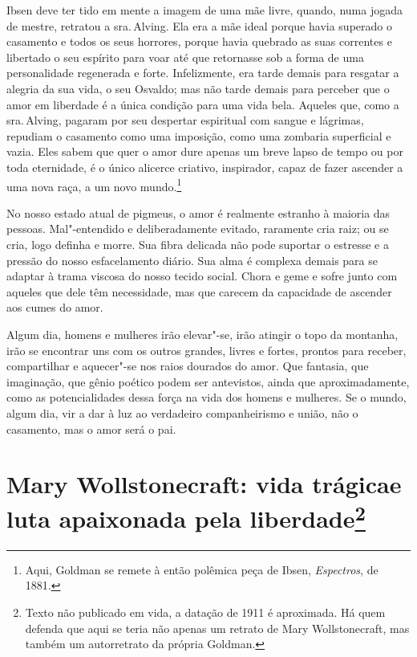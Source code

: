 Ibsen deve ter tido em mente a imagem de uma mãe livre, quando, numa
jogada de mestre, retratou a sra.\,Alving. Ela era a mãe ideal porque
havia superado o casamento e todos os seus horrores, porque havia
quebrado as suas correntes e libertado o seu espírito para voar até que
retornasse sob a forma de uma personalidade regenerada e forte.
Infelizmente, era tarde demais para resgatar a alegria da sua vida, o
seu Osvaldo; mas não tarde demais para perceber que o amor em liberdade
é a única condição para uma vida bela. Aqueles que, como a sra.\,Alving,
pagaram por seu despertar espiritual com sangue e lágrimas, repudiam o
casamento como uma imposição, como uma zombaria superficial e vazia.
Eles sabem que quer o amor dure apenas um breve lapso de tempo ou por
toda eternidade, é o único alicerce criativo, inspirador, capaz de fazer
ascender a uma nova raça, a um novo mundo.\footnote{Aqui, Goldman se remete à então polêmica peça de Ibsen, \textit{Espectros}, de 1881.}

No nosso estado atual de pigmeus, o amor é realmente estranho à maioria
das pessoas. Mal"-entendido e deliberadamente evitado, raramente cria
raiz; ou se cria, logo definha e morre. Sua fibra delicada não pode
suportar o estresse e a pressão do nosso esfacelamento diário. Sua alma é complexa
demais para se adaptar à trama viscosa do nosso tecido social. Chora e
geme e sofre junto com aqueles que dele têm necessidade, mas que carecem
da capacidade de ascender aos cumes do amor.

Algum dia, homens e mulheres irão elevar"-se, irão atingir o topo da
montanha, irão se encontrar uns com os outros grandes, livres e fortes,
prontos para receber, compartilhar e aquecer"-se nos raios dourados do
amor. Que fantasia, que imaginação, que gênio poético podem ser antevistos, ainda que aproximadamente, como as potencialidades dessa força na vida
dos homens e mulheres. Se o mundo, algum dia, vir a dar à luz ao verdadeiro
companheirismo e união, não o casamento, mas o amor será o pai.

\chapter[Mary Wollstonecraft: vida trágica e luta apaixonada pela liberdade]{Mary Wollstonecraft: vida trágica\break e luta apaixonada pela
liberdade\footnote[*]{Texto não publicado em vida, a datação de 1911 é
  aproximada. Há quem defenda que aqui se teria não apenas um retrato de
  Mary Wollstonecraft, mas também um autorretrato da própria Goldman.}}

